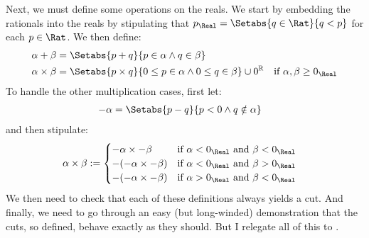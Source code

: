 \documentclass[../../../include/open-logic-section]{subfiles}
\begin{document}
Next, we must define some operations on the reals. We start by embedding the rationals into the reals by stipulating that $p_\Real = \Setabs{q \in \Rat}{q < p}$ for each $p \in \Rat$. We then define:
\begin{align*}
	\alpha + \beta &= \Setabs{p + q}{p \in \alpha \land q \in \beta}\\
	\alpha \times \beta &= 
	\Setabs{p \times q}{0 \leq p \in \alpha \land 0 \leq q \in \beta} \cup 0^\mathbb{R} & \text{if }\alpha, \beta \geq 0_\Real
\end{align*}
To handle the other multiplication cases, first let: %
\begin{align*}
	-\alpha &= \Setabs{p - q}{p < 0 \land q \notin \alpha}
\end{align*}
and then stipulate:
\begin{align*}
	\alpha \times \beta &:= 
	\begin{cases}
		\mathord{-}\alpha \times \mathord{-}\beta &\text{if }\alpha < 0_\Real\text{ and }\beta < 0_\Real\\
		\mathord{-}(\mathord{-}\alpha \times \mathord{-}\beta) &\text{if }\alpha < 0_\Real \text{ and }\beta > 0_\Real\\
		\mathord{-}(\mathord{-}\alpha \times \mathord{-}\beta) &\text{if }\alpha > 0_\Real \text{ and }\beta < 0_\Real
	\end{cases}
\end{align*}
 We then need to check that each of these definitions always yields a cut. And finally, we need to go through an easy (but long-winded) demonstration that the cuts, so defined, behave exactly as they should. But I relegate all of this to .
\end{document}
